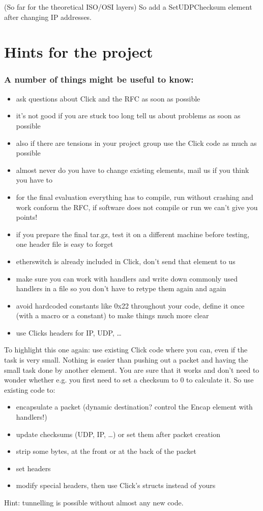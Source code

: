 \documentclass[a4paper]{article}
\begin{document}
(So far for the theoretical ISO/OSI layers) So add a SetUDPChecksum
element after changing IP addresses.

\section{Hints for the project}

\subsubsection*{A number of things might be useful to know:}

\begin{itemize}
\item
  ask questions about Click and the RFC as soon as possible
\item
  it's not good if you are stuck too long tell us about problems as soon
  as possible
\item
  also if there are tensions in your project group use the Click code as
  much as possible
\item
  almost never do you have to change existing elements, mail us if you
  think you have to
\item
  for the final evaluation everything has to compile, run without
  crashing and work conform the RFC, if software does not compile or run
  we can't give you points!
\item
  if you prepare the final tar.gz, test it on a different machine before
  testing, one header file is easy to forget
\item
  etherswitch is already included in Click, don't send that element to
  us
\item
  make sure you can work with handlers and write down commonly used
  handlers in a file so you don't have to retype them again and again
\item
  avoid hardcoded constants like 0x22 throughout your code, define it
  once (with a macro or a constant) to make things much more clear
\item
  use Clicks headers for IP, UDP, \ldots{}
\end{itemize}

To highlight this one again: use existing Click code where you can, even
if the task is very small. Nothing is easier than pushing out a packet
and having the small task done by another element. You are sure that it
works and don't need to wonder whether e.g. you first need to set a
checksum to 0 to calculate it. So use existing code to:

\begin{itemize}
\item
  encapsulate a packet (dynamic destination? control the Encap element
  with handlers!)
\item
  update checksums (UDP, IP, \ldots{}) or set them after packet creation
\item
  strip some bytes, at the front or at the back of the packet
\item
  set headers
\item
  modify special headers, then use Click's structs instead of yours
\end{itemize}

Hint: tunnelling is possible without almost any new code.
\end{document}
